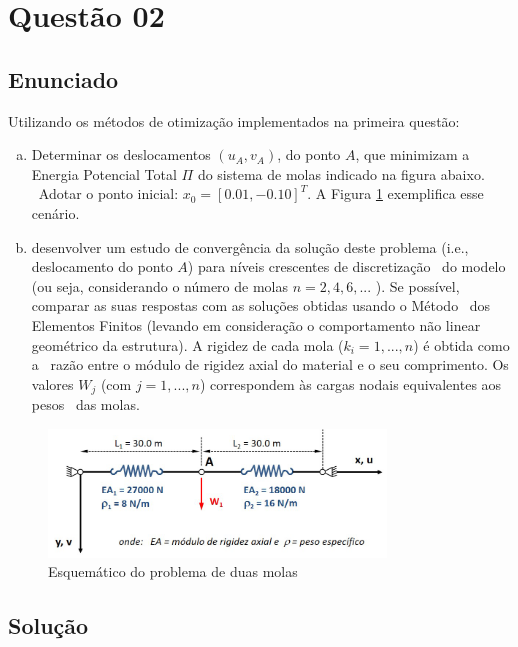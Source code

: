 \documentclass[10pt, a4paper]{article}
\begin{document}
\section{Questão 02}

\subsection{Enunciado}

Utilizando os métodos de otimização implementados na primeira questão:

\begin{enumerate}[(a)]
  \item Determinar os deslocamentos $(u_A, v_A)$, do ponto $A$, que minimizam a Energia Potencial Total $\Pi$ do sistema de molas indicado na figura abaixo. \
  Adotar o ponto inicial: $x_0 = [0.01, -0.10]^T$. A Figura \ref{fig:q2_schema} exemplifica esse cenário.
  \item desenvolver um estudo de convergência da solução deste problema (i.e., deslocamento do ponto $A$) para níveis crescentes de discretização \
  do modelo (ou seja, considerando o número de molas $n = 2, 4, 6, ...$ ). Se possível, comparar as suas respostas com as soluções obtidas usando o Método \
  dos Elementos Finitos (levando em consideração o comportamento não linear geométrico da estrutura). A rigidez de cada mola ($k_i = 1, ..., n$) é obtida como a \
  razão entre o módulo de rigidez axial do material e o seu comprimento. Os valores $W_j$ (com $j = 1, ..., n$) correspondem às cargas nodais equivalentes aos pesos \
  das molas.
\end{enumerate}

\begin{figure}[htpb]
  \centering
  \includegraphics[width=0.8\textwidth]{images/molas.png}
  \caption{Esquemático do problema de duas molas}
  \label{fig:q2_schema}
\end{figure}

\subsection{Solução}
\end{document}

